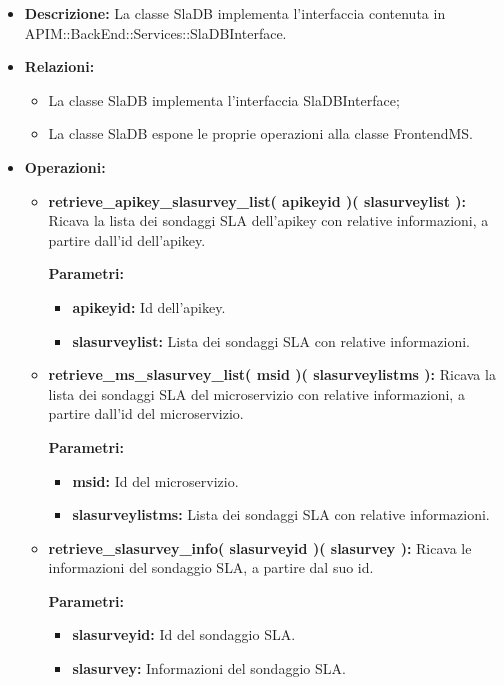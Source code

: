 \begin{itemize}
	\item \textbf{Descrizione:} La classe SlaDB implementa l'interfaccia contenuta in APIM::BackEnd::Services::SlaDBInterface.
	\item \textbf{Relazioni:}
		\begin{itemize}
			\item La classe SlaDB implementa l'interfaccia SlaDBInterface;
			\item La classe SlaDB espone le proprie operazioni alla classe FrontendMS.
		\end{itemize}
	\item \textbf{Operazioni:}
		\begin{itemize}
		
			\item \textbf{retrieve\_apikey\_slasurvey\_list( apikeyid )( slasurveylist ):} Ricava la lista dei sondaggi SLA dell'apikey con relative informazioni, a partire dall'id dell'apikey.
				\begin{description}
    				\item[\textbf{Parametri:}]
				\end{description}
				\begin{itemize}
					\item \textbf{apikeyid:} Id dell'apikey.
					\item \textbf{slasurveylist:} Lista dei sondaggi SLA con relative informazioni.
				\end{itemize}
				
			\item \textbf{retrieve\_ms\_slasurvey\_list( msid )( slasurveylistms ):} Ricava la lista dei sondaggi SLA del microservizio con relative informazioni, a partire dall'id del microservizio.
				\begin{description}
    				\item[\textbf{Parametri:}]
				\end{description}
				\begin{itemize}
					\item \textbf{msid:} Id del microservizio.
					\item \textbf{slasurveylistms:} Lista dei sondaggi SLA con relative informazioni.
				\end{itemize}
				
			\item \textbf{retrieve\_slasurvey\_info( slasurveyid )( slasurvey ):} Ricava le informazioni del sondaggio SLA, a partire dal suo id.
				\begin{description}
    				\item[\textbf{Parametri:}]
				\end{description}
				\begin{itemize}
					\item \textbf{slasurveyid:} Id del sondaggio SLA.
					\item \textbf{slasurvey:} Informazioni del sondaggio SLA.
				\end{itemize}
				

\end{itemize}
\end{itemize}
